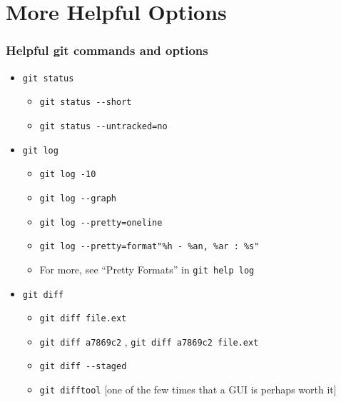 \documentclass{beamer}
\begin{document}
\section{More Helpful Options}
\begin{frame}[fragile]
\frametitle{Helpful git commands and options}
\begin{itemize}
\item \lstinline{git status}
\begin{itemize}
\item \lstinline{git status --short}
\item \lstinline{git status --untracked=no}
\end{itemize}
\item \lstinline{git log}
\begin{itemize}
\item \lstinline{git log -10}
\item \lstinline{git log --graph}
\item \lstinline{git log --pretty=oneline}
\item \lstinline{git log --pretty=format"%h - %an, %ar : %s"}
\item For more, see ``Pretty Formats'' in \lstinline{git help log}
\end{itemize}
\item \lstinline{git diff}
\begin{itemize}
\item \lstinline{git diff file.ext}
\item \lstinline{git diff a7869c2} , \lstinline{git diff a7869c2 file.ext}
\item \lstinline{git diff --staged}
\item \lstinline{git difftool} [one of the few times that a GUI is perhaps worth it]
\end{itemize}
\end{itemize}
\end{frame}
\end{document}
